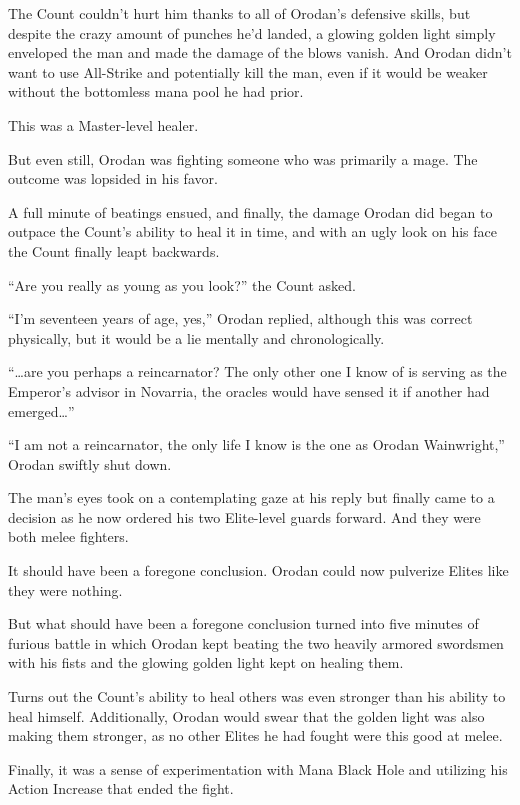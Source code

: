 \documentclass[a4paper,10pt]{book}
\begin{document}
The Count couldn’t hurt him thanks to all of Orodan’s defensive skills, but despite the crazy amount of punches he’d landed, a glowing golden light simply enveloped the man and made the damage of the blows vanish. And Orodan didn’t want to use All-Strike and potentially kill the man, even if it would be weaker without the bottomless mana pool he had prior.\par
This was a Master-level healer.\par
But even still, Orodan was fighting someone who was primarily a mage. The outcome was lopsided in his favor.\par
A full minute of beatings ensued, and finally, the damage Orodan did began to outpace the Count’s ability to heal it in time, and with an ugly look on his face the Count finally leapt backwards.\par
“Are you really as young as you look?” the Count asked.\par
“I’m seventeen years of age, yes,” Orodan replied, although this was correct physically, but it would be a lie mentally and chronologically.\par
“…are you perhaps a reincarnator? The only other one I know of is serving as the Emperor’s advisor in Novarria, the oracles would have sensed it if another had emerged…”\par
“I am not a reincarnator, the only life I know is the one as Orodan Wainwright,” Orodan swiftly shut down.\par
The man’s eyes took on a contemplating gaze at his reply but finally came to a decision as he now ordered his two Elite-level guards forward. And they were both melee fighters.\par
It should have been a foregone conclusion. Orodan could now pulverize Elites like they were nothing.\par
But what should have been a foregone conclusion turned into five minutes of furious battle in which Orodan kept beating the two heavily armored swordsmen with his fists and the glowing golden light kept on healing them.\par
Turns out the Count’s ability to heal others was even stronger than his ability to heal himself. Additionally, Orodan would swear that the golden light was also making them stronger, as no other Elites he had fought were this good at melee.\par
Finally, it was a sense of experimentation with Mana Black Hole and utilizing his Action Increase that ended the fight.\par
\end{document}
